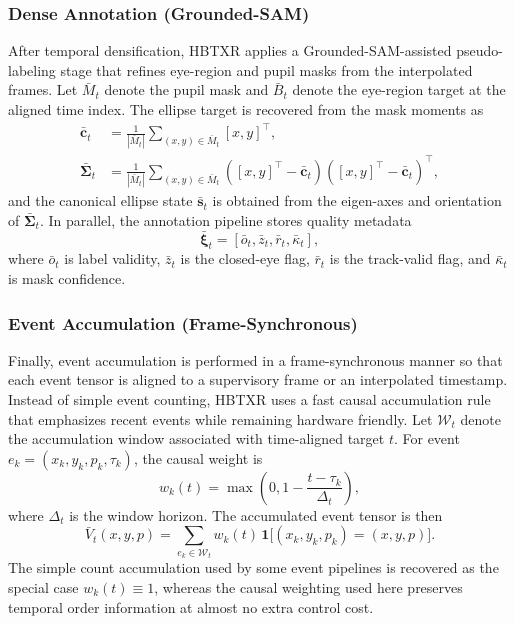 \documentclass[journal]{IEEEtran}
\begin{document}
\subsubsection{Dense Annotation (Grounded-SAM)}
After temporal densification, HBTXR applies a Grounded-SAM-assisted pseudo-labeling stage that refines eye-region and pupil masks from the interpolated frames. Let $\bar M_t$ denote the pupil mask and $\bar B_t$ denote the eye-region target at the aligned time index. The ellipse target is recovered from the mask moments as
\begin{align}
\bar{\mathbf c}_t &= \frac{1}{|\bar M_t|}\sum_{(x,y)\in \bar M_t}[x,y]^{\top},\\
\bar{\bm\Sigma}_t &= \frac{1}{|\bar M_t|}\sum_{(x,y)\in \bar M_t}
([x,y]^{\top}-\bar{\mathbf c}_t)([x,y]^{\top}-\bar{\mathbf c}_t)^{\top},
\end{align}
and the canonical ellipse state $\bar{\mathbf s}_t$ is obtained from the eigen-axes and orientation of $\bar{\bm\Sigma}_t$. In parallel, the annotation pipeline stores quality metadata
\begin{equation}
\bar{\bm\xi}_t=[\bar o_t,\bar z_t,\bar r_t,\bar \kappa_t] ,
\end{equation}
where $\bar o_t$ is label validity, $\bar z_t$ is the closed-eye flag, $\bar r_t$ is the track-valid flag, and $\bar \kappa_t$ is mask confidence.

\subsubsection{Event Accumulation (Frame-Synchronous)}
Finally, event accumulation is performed in a frame-synchronous manner so that each event tensor is aligned to a supervisory frame or an interpolated timestamp. Instead of simple event counting, HBTXR uses a fast causal accumulation rule that emphasizes recent events while remaining hardware friendly. Let $\mathcal W_t$ denote the accumulation window associated with time-aligned target $t$. For event $e_k=(x_k,y_k,p_k,\tau_k)$, the causal weight is
\begin{equation}
w_k(t)=\max\!\left(0,1-\frac{t-\tau_k}{\Delta_t}\right),
\end{equation}
where $\Delta_t$ is the window horizon. The accumulated event tensor is then
\begin{equation}
\bar V_t(x,y,p)=\sum_{e_k\in \mathcal W_t}
w_k(t)\,
\mathbf 1\big[(x_k,y_k,p_k)=(x,y,p)\big].
\end{equation}
The simple count accumulation used by some event pipelines is recovered as the special case $w_k(t)\equiv 1$, whereas the causal weighting used here preserves temporal order information at almost no extra control cost.
\end{document}
